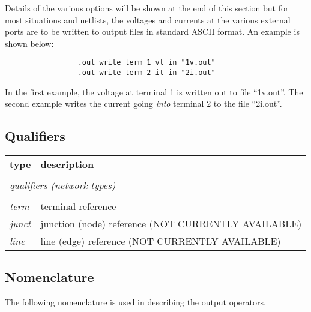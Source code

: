 Details of the various options will be shown at the end of this
section but for most situations and netlists, the voltages and
currents at the various external ports are to be written to output
files in standard ASCII format. An example is shown below:

\begin{tt}
\begin{verbatim}
                 .out write term 1 vt in "1v.out"
                 .out write term 2 it in "2i.out"
\end{verbatim}
\end{tt}

In the first example, the voltage at terminal 1 is written out to
file ``1v.out''.  The second example writes the current going {\em
into} terminal 2 to the file ``2i.out''.

\clearpage
\subsection{Qualifiers}

\begin{tabular}{ll}
{\bf type} & {\bf description} \\
\\
\multicolumn{2}{l}{\sl qualifiers  (network types)} \\
\\
{\it term} & terminal reference\\
{\it junct} & junction (node) reference (NOT CURRENTLY AVAILABLE) \\
{\it line} & line (edge) reference (NOT CURRENTLY AVAILABLE)
\end{tabular}

\subsection{Nomenclature}

The following nomenclature is used in describing the output
operators.

